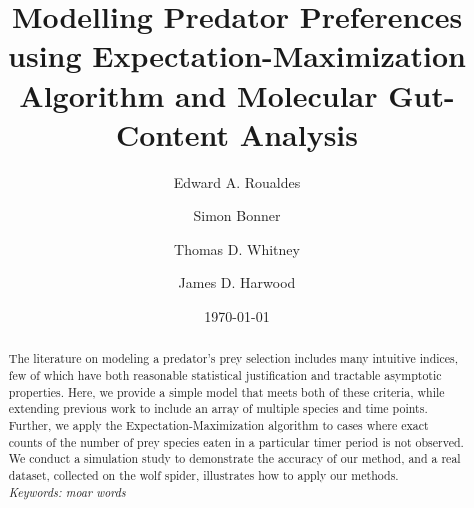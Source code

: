 \documentclass[12pt,titlepage]{article}
\begin{document}
\title{Modelling Predator Preferences using Expectation-Maximization Algorithm and Molecular Gut-Content Analysis}
\author[1]{Edward A. Roualdes}
\author[1]{Simon Bonner}
\author[2]{Thomas D. Whitney}
\author[3]{James D. Harwood}

\date{\today}
\maketitle

\begin{abstract}
The literature on modeling a predator's prey selection includes many intuitive indices, few of which have both reasonable statistical justification and tractable asymptotic properties.  Here, we provide a simple model that meets both of these criteria, while extending previous work to include an array of multiple species and time points.  Further, we apply the Expectation-Maximization algorithm to cases where exact counts of the number of prey species eaten in a particular timer period is not observed.  We conduct a simulation study to demonstrate the accuracy of our method, and a real dataset, collected on the wolf spider, illustrates how to apply our methods. \\
\textit{Keywords: moar words}
\end{abstract}












\end{document}
